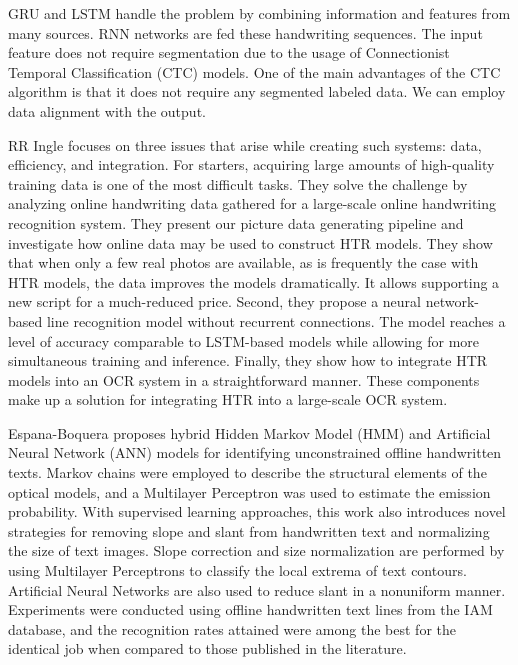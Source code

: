 \documentclass[preprint,12pt]{elsarticle}
\begin{document}
GRU and LSTM handle the problem by combining information and features from many sources. RNN networks are fed these handwriting sequences. The input feature does not require segmentation due to the usage of Connectionist Temporal Classification (CTC) \cite{graves2006connectionist} models. One of the main advantages of the CTC algorithm is that it does not require any segmented labeled data. We can employ data alignment with the output.

RR Ingle \cite{ingle2019scalable} focuses on three issues that arise while creating such systems: data, efficiency, and integration. For starters, acquiring large amounts of high-quality training data is one of the most difficult tasks. They solve the challenge by analyzing online handwriting data gathered for a large-scale online handwriting recognition system. They present our picture data generating pipeline and investigate how online data may be used to construct HTR models. They show that when only a few real photos are available, as is frequently the case with HTR models, the data improves the models dramatically. It allows supporting a new script for a much-reduced price. Second, they propose a neural network-based line recognition model without recurrent connections. The model reaches a level of accuracy comparable to LSTM-based models while allowing for more simultaneous training and inference. Finally, they show how to integrate HTR models into an OCR system in a straightforward manner. These components make up a solution for integrating HTR into a large-scale OCR system.

Espana-Boquera \cite{espana2010improving} proposes hybrid Hidden Markov Model (HMM) and Artificial Neural Network (ANN) models for identifying unconstrained offline handwritten texts. Markov chains were employed to describe the structural elements of the optical models, and a Multilayer Perceptron was used to estimate the emission probability. With supervised learning approaches, this work also introduces novel strategies for removing slope and slant from handwritten text and normalizing the size of text images. Slope correction and size normalization are performed by using Multilayer Perceptrons to classify the local extrema of text contours. Artificial Neural Networks are also used to reduce slant in a nonuniform manner. Experiments were conducted using offline handwritten text lines from the IAM database, and the recognition rates attained were among the best for the identical job when compared to those published in the literature.
\end{document}
